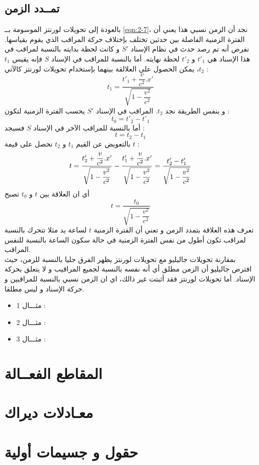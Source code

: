 \subsection{تمــدد الزمن}
بالعودة إلى تحويلات لورنتز الموسومة بــ \eqref{eqn:2-7}، نجد أن الزمن نسبي هذا يعني أن الفترة الزمنية الفاصلة بين حدثين تختلف بإختلاف حركة المراقب الذي يقوم بقياسها. نفرض أنه تم رصد حدث في نظام الإسناد 
$S'$ 
و كانت لحظة بدايته بالنسبة لمراقب في هذا الإسناد هي $t'_{1}$ و $t'_{2}$ لحظة نهايته. أما بالنسبة للمراقب في الإسناد $S$ فإنه يقيس $t_{1}$  $t_{2}$، يمكن الحصول على العلالقة بينهما بإستخدام تحويلات لورنتز كاﻵتي :
\begin{equation}
	t_{1} = \dfrac{t'_{1}+\dfrac{v}{c^{2}}.x'}{\sqrt{1-\dfrac{v^{2}}{c^{2}}}}
\end{equation}
و بنفس الطريقة نجد $t_{2}$. 
المراقب في الإسناد 
$S'$  
يحسب الفترة الزمنية لتكون :
\begin{equation}
	t_{0}= t'_{2} - t'_{1}
\end{equation}
أما بالنسبة للمراقب اﻵخر في الإسناد $S$ فسيجد :
\begin{equation}
	t= t_{2} - t_{1}
\end{equation}
بالتعويض عن القيم $t_{1}$  و $t_{2}$ نحصل على قيمة $t$ :
\begin{equation}
	t=\frac{t'_{2}+\dfrac{v}{c^{2}}.x'}{\sqrt{1-\dfrac{v^{2}}{c^{2}}}} - \frac{t'_{1}+\dfrac{v}{c^{2}}.x'}{\sqrt{1-\dfrac{v^{2}}{c^{2}}}} \\
	 = \frac{t'_{2}-t'_{1}}{\sqrt{1-\dfrac{v^{2}}{c^{2}}}}
\end{equation}
أي ان العلاقة بين $t$ و $t_{0}$ تصبح
\begin{equation}
	t = \frac{t_{0}}{\sqrt{1- \dfrac{v^{2}}{c^{2}}}}
\end{equation}
تعرف هذه العلاقة بتمدد الزمن و تعني أن الفترة الزمنية $t$ لساعة يد مثلا تتحرك بالنسبة لمراقب تكون أطول من نفس الفترة الزمنية في حالة سكون الساعة بالنسبة للنفس المراقب.\\
بمقارنة تحويلات جاليليو مع تحويلات لورنتز يظهر الفرق جليا بالنسبة للزمن، حيث افترض جاليليو أن الزمن مطلق أي  أنه نفسه بالنسبة لجميع المراقيب و لا يتعلق بحركة الإسناد. أما تحويلات لورنتز فقد أثبتت غير ذالك، اي ان الزمن نسبي بالنسبة للمراقبين و حركة الإسناد و ليس مطلقا.
\begin{itemize}
	\item مثـــال 1 :
	\item مثـــال 2 :
	\item مثـــال 3 :
\end{itemize}
\section{المقاطع الفعــالة}
\section{معـادلات ديراك}

\section{حقول و جسيمات أولية}




